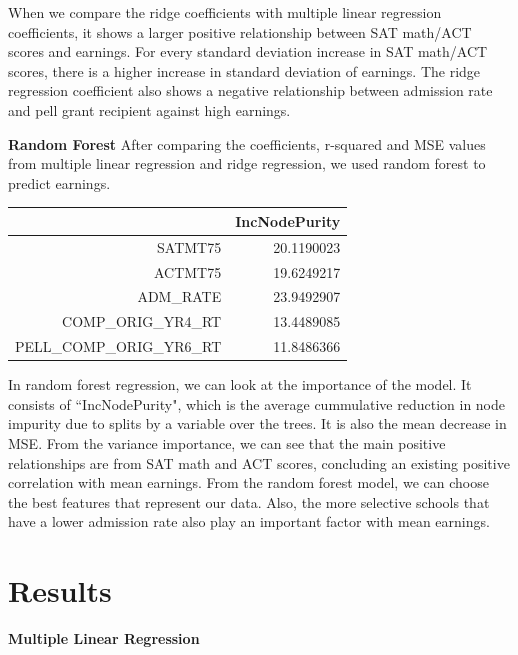 \documentclass{article}
\begin{document}
  When we compare the ridge coefficients with multiple linear regression coefficients, it shows a larger positive relationship between SAT math/ACT scores and earnings.  For every standard deviation increase in SAT math/ACT scores, there is a higher increase in standard deviation of earnings. The ridge regression coefficient also shows a negative relationship between admission rate and pell grant recipient against high earnings.
\newline
\newline

\textbf{Random Forest} \newline
  After comparing the coefficients, r-squared and MSE values from multiple linear regression and ridge regression, we used random forest to predict earnings. 

\begin{table}[ht]
\centering
\begin{tabular}{rr}
  \hline
 & IncNodePurity \\ 
  \hline
SATMT75 & 20.1190023 \\ 
  ACTMT75 & 19.6249217 \\ 
  ADM\_RATE & 23.9492907 \\ 
  COMP\_ORIG\_YR4\_RT & 13.4489085 \\ 
  PELL\_COMP\_ORIG\_YR6\_RT & 11.8486366 \\ 
   \hline
\end{tabular}
\end{table}
  In random forest regression, we can look at the importance of the model.  It consists of ``IncNodePurity", which is the average cummulative reduction in node impurity due to splits by a variable over the trees. It is also the mean decrease in MSE.  From the variance importance, we can see that the main positive relationships are from SAT math and ACT scores, concluding an existing positive correlation with mean earnings.  From the random forest model, we can choose the best features that represent our data.  Also, the more selective schools that have a lower admission rate also play an important factor with mean earnings. 


\section{Results}

\textbf{Multiple Linear Regression}\newline
\end{document}
